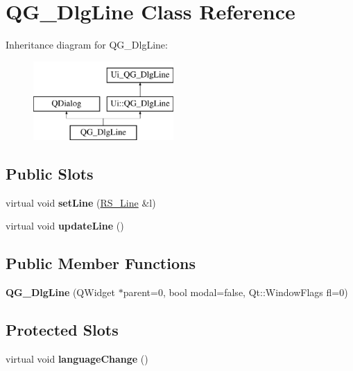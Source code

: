 \hypertarget{classQG__DlgLine}{\section{Q\-G\-\_\-\-Dlg\-Line Class Reference}
\label{classQG__DlgLine}
}
Inheritance diagram for Q\-G\-\_\-\-Dlg\-Line\-:\begin{figure}[H]
\begin{center}
\leavevmode
\includegraphics[height=3.000000cm]{classQG__DlgLine}
\end{center}
\end{figure}
\subsection*{Public Slots}
\begin{DoxyCompactItemize}
\item 
\hypertarget{classQG__DlgLine_a38707c601237bc5e174b50687327a32f}{virtual void {\bfseries set\-Line} (\hyperlink{classRS__Line}{R\-S\-\_\-\-Line} \&l)}\label{classQG__DlgLine_a38707c601237bc5e174b50687327a32f}

\item 
\hypertarget{classQG__DlgLine_aa1b35f1d9d3eae99e18db163de0b8e0a}{virtual void {\bfseries update\-Line} ()}\label{classQG__DlgLine_aa1b35f1d9d3eae99e18db163de0b8e0a}

\end{DoxyCompactItemize}
\subsection*{Public Member Functions}
\begin{DoxyCompactItemize}
\item 
\hypertarget{classQG__DlgLine_a2ec095e73e23339e34ffe8fc588565fa}{{\bfseries Q\-G\-\_\-\-Dlg\-Line} (Q\-Widget $\ast$parent=0, bool modal=false, Qt\-::\-Window\-Flags fl=0)}\label{classQG__DlgLine_a2ec095e73e23339e34ffe8fc588565fa}

\end{DoxyCompactItemize}
\subsection*{Protected Slots}
\begin{DoxyCompactItemize}
\item 
\hypertarget{classQG__DlgLine_ad5f3e4b71493bfa56287c9162743a01b}{virtual void {\bfseries language\-Change} ()}\label{classQG__DlgLine_ad5f3e4b71493bfa56287c9162743a01b}

\end{DoxyCompactItemize}
